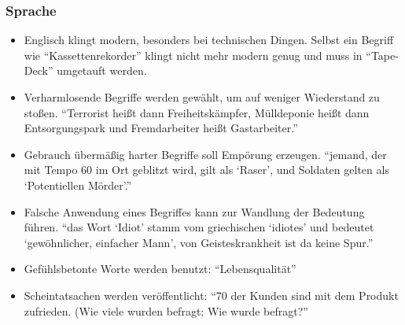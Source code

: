 \subsubsection{Sprache}
\begin{itemize}
	\item Englisch klingt modern, besonders bei technischen Dingen. Selbst ein Begriff wie
\enquote{Kassettenrekorder} klingt nicht mehr modern genug und muss in \enquote{Tape-Deck} umgetauft werden.

	\item Verharmlosende Begriffe werden gewählt, um auf weniger Wiederstand zu stoßen.
\zB \enquote{Terrorist heißt dann Freiheitskämpfer, Mülldeponie heißt dann Entsorgungspark und Fremdarbeiter
heißt Gastarbeiter.}

	\item Gebrauch übermäßig harter Begriffe soll Empörung erzeugen.
\zB \enquote{jemand, der mit Tempo 60 im Ort geblitzt wird, gilt als \enquote{Raser}, und Soldaten
gelten als \enquote{Potentiellen Mörder}.}

	\item Falsche Anwendung eines Begriffes kann zur Wandlung der Bedeutung führen.
\zB \enquote{das Wort \enquote{Idiot} stamm vom griechischen \enquote{idiotes} und bedeutet \enquote{gewöhnlicher, einfacher Mann},
von Geisteskrankheit ist da keine Spur.}

	\item Gefühlsbetonte Worte werden benutzt: \enquote{Lebensqualität}
	\item Scheintatsachen werden veröffentlicht:
\zB \enquote{70\Prozent{} der Kunden sind mit dem Produkt zufrieden. (Wie viele wurden befragt; Wie wurde
befragt?}
\end{itemize}

